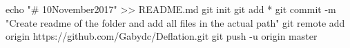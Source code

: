 echo "# 10November2017" >> README.md
git init
git add *
git commit -m "Create readme of the folder and add all files in the actual path"
git remote add origin https://github.com/Gabydc/Deflation.git
git push -u origin master
